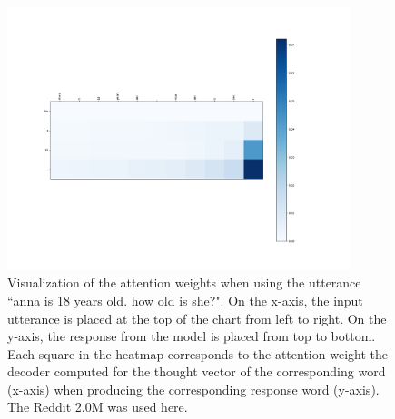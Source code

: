 \begin{figure}[H]
	\centering
	\includegraphics[width=10cm]{img/attention/attention_visualization3_reddit_2m.png}
	\caption{Visualization of the attention weights when using the utterance ``anna is 18 years old. how old is she?". On the x-axis, the input utterance is placed at the top of the chart from left to right. On the y-axis, the response from the model is placed from top to bottom. Each square in the heatmap corresponds to the attention weight the decoder computed for the thought vector of the corresponding word (x-axis) when producing the corresponding response word (y-axis). The Reddit 2.0M was used here.}
	\label{results:attention:example3:reddit}
\end{figure}
